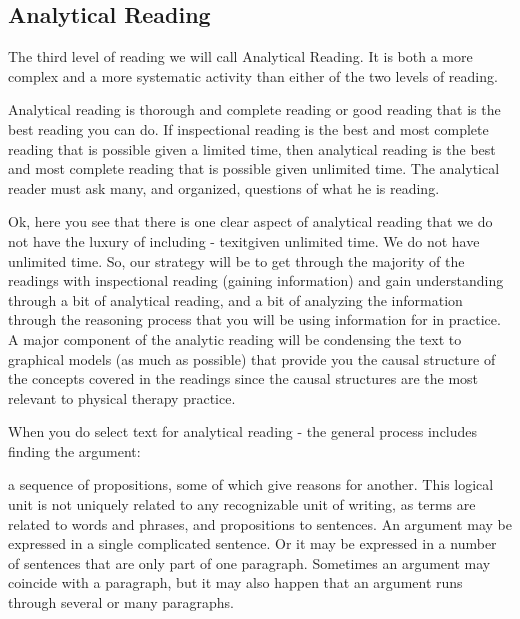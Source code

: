 \subsection{Analytical Reading}
\begin{displayquote}
The third level of reading we will call Analytical Reading. It is both a more complex and a more systematic activity than either of the two levels of reading.

Analytical reading is thorough and complete reading or good reading that is the best reading you can do. If inspectional reading is the best and most complete reading that is possible given a limited time, then analytical reading is the best and most complete reading that is possible given unlimited time. The analytical reader must ask many, and organized, questions of what he is reading.
\end{displayquote}

Ok, here you see that there is one clear aspect of analytical reading that we do not have the luxury of including - texit{given unlimited time}. We do not have unlimited time. So, our strategy will be to get through the majority of the readings with inspectional reading (gaining information) and gain understanding through a bit of analytical reading, and a bit of analyzing the information through the reasoning process that you will be using information for in practice. A major component of the analytic reading will be condensing the text to graphical  models (as much as possible) that provide you the causal structure of the concepts covered in the readings since the causal structures are the most relevant to physical therapy practice.

When you do select text for analytical reading - the general process includes finding the argument:
\begin{displayquote}
a sequence of propositions, some of which give reasons for another. This logical unit is not uniquely related to any recognizable unit of writing, as terms are related to words and phrases, and propositions to sentences. An argument may be expressed in a single complicated sentence. Or it may be expressed in a number of sentences that are only part of one paragraph. Sometimes an argument may coincide with a paragraph, but it may also happen that an argument runs through several or many paragraphs.
\end{displayquote}


